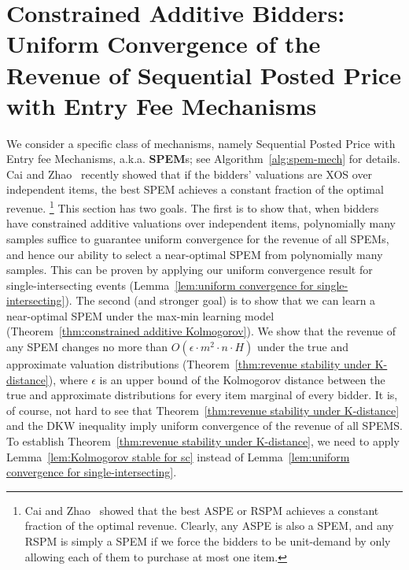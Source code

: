 \section{Constrained Additive Bidders: Uniform Convergence of the Revenue of Sequential Posted Price with Entry Fee Mechanisms}\label{sec:uniform convergence of SPEM}

We consider a specific class of mechanisms, namely Sequential Posted Price with Entry fee Mechanisms, a.k.a. \textbf{SPEM}s; see Algorithm~\ref{alg:spem-mech} for details. Cai and Zhao~\cite{CaiZ17} recently showed that if the bidders' valuations are XOS over independent items, the best SPEM achieves a constant fraction of the optimal revenue. \footnote{Cai and Zhao~\cite{CaiZ17} showed that the best ASPE or RSPM achieves a constant fraction of the optimal revenue. Clearly, any ASPE is also a SPEM, and any RSPM is simply a SPEM if we force the bidders to be unit-demand by only allowing each of them to purchase at most one item.} This section has two goals. The first is to show that, when bidders have constrained additive valuations over independent items, polynomially many samples suffice to guarantee uniform convergence for the revenue of all SPEMs, and hence our ability to select a near-optimal SPEM from polynomially many samples. This can be proven by applying our uniform convergence result for single-intersecting events (Lemma~\ref{lem:uniform convergence for single-intersecting}). The second (and stronger goal) is to show that we can learn a near-optimal SPEM under the max-min learning model (Theorem~\ref{thm:constrained additive Kolmogorov}). We show that the revenue of any SPEM changes no more than $O(\epsilon \cdot m^2\cdot n \cdot H)$ under the true and approximate valuation distributions (Theorem~\ref{thm:revenue stability under K-distance}), where $\epsilon$ is an upper bound of the Kolmogorov distance between the true and approximate distributions for every item marginal of every bidder. It is, of course, not hard to see that Theorem~\ref{thm:revenue stability under K-distance} and the DKW inequality imply uniform convergence of the revenue of all SPEMS. To establish Theorem~\ref{thm:revenue stability under K-distance}, we need to apply Lemma~\ref{lem:Kolmogorov stable for sc} instead of Lemma~\ref{lem:uniform convergence for single-intersecting}.


